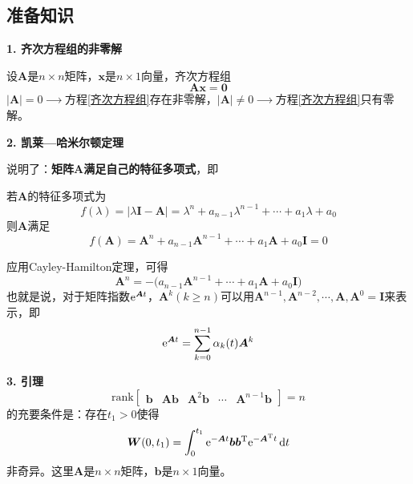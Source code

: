 \subsection{准备知识}
\noindent \textbf{1. 齐次方程组的非零解}

设$\bm{A}$是$n\times n$矩阵，$\bm{x}$是$n \times 1$向量，齐次方程组
\begin{equation}
	\bm{Ax} = \bm{0}
	\label{齐次方程组}
\end{equation}
$|\bm{A}| = 0 \xrightarrow{\quad \quad }$方程\eqref{齐次方程组}存在非零解，$|\bm{A}| \neq 0 \xrightarrow{\quad \quad }$方程\eqref{齐次方程组}只有零解。
\vspace*{1em}

\noindent \textbf{2. 凯莱—哈米尔顿定理}

说明了：\textbf{矩阵$\bm{A}$满足自己的特征多项式}，即

若$\bm{A}$的特征多项式为
\begin{equation}
	f(\lambda) = |\lambda \bm{I} - \bm{A}| = \lambda^n + a_{n-1}\lambda^{n-1} + \cdots + a_1 \lambda + a_0
\end{equation}
则$\bm{A}$满足
\begin{equation}
	f(\bm{A}) = \bm{A}^n + a_{n-1}\bm{A}^{n-1} + \cdots + a_1 \bm{A}+ a_0 \bm{I} = 0
\end{equation}

应用Cayley-Hamilton定理，可得
\begin{equation}
	\bm{A}^n = - \big(a_{n-1}\bm{A}^{n-1} + \cdots + a_1 \bm{A} + a_0 \bm{I}\big)
\end{equation}
也就是说，对于矩阵指数${\rm{e}}^{\bm{A}t}$，$\bm{A}^k(k \ge n)$可以用$\bm{A}^{n-1}, \bm{A}^{n-2}, \cdots, \bm{A}, \bm{A}^0 = \bm{I}$来表示，即
\begin{equation}
	{\rm{e}}^{\bm{A}t} = \sum_{k = 0}^{n - 1}\alpha_k(t)\bm{A}^k
\end{equation}
\vspace*{0.5em}

\noindent \textbf{3. 引理}
\begin{equation}
	\text{rank}
	\begin{bmatrix}
		\bm{b} & \bm{Ab} & \bm{A}^2\bm{b} &\cdots & \bm{A}^{n-1}\bm{b}
	\end{bmatrix}
	= n
\end{equation}
的充要条件是：存在$t_1 > 0$使得
\begin{equation}
	\bm{W}(0,t_1) = \int_0^{t_1}{\rm{e}}^{-\bm{A}t}\bm{b}\bm{b}^{\text{T}}{\rm{e}}^{-\bm{A}^{\text{T}}t}\, {\rm{d}} t
\end{equation}
非奇异。这里$\bm{A}$是$n \times n$矩阵，$\bm{b}$是$n \times 1$向量。
\vspace*{1em}


